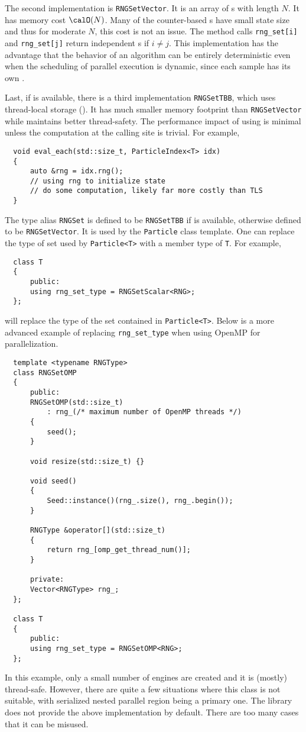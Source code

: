 The second implementation is \verb|RNGSetVector|. It is an array of \rng{}s
with length $N$. It has memory cost $\calO(N)$. Many of the counter-based
\rng{}s have small state size and thus for moderate $N$, this cost is not an
issue. The method calls \verb|rng_set[i]| and \verb|rng_set[j]| return
independent \rng{}s if $i \ne j$. This implementation has the advantage that
the behavior of an algorithm can be entirely deterministic even when the
scheduling of parallel execution is dynamic, since each sample has its own
\rng.

Last, if \tbb is available, there is a third implementation \verb|RNGSetTBB|,
which uses thread-local storage (\tls). It has much smaller memory footprint
than \verb|RNGSetVector| while maintains better thread-safety. The performance
impact of using \tls is minimal unless the computation at the calling site is
trivial. For example,
\begin{Verbatim}
  void eval_each(std::size_t, ParticleIndex<T> idx)
  {
      auto &rng = idx.rng();
      // using rng to initialize state
      // do some computation, likely far more costly than TLS
  }
\end{Verbatim}
The type alias \verb|RNGSet| is defined to be \verb|RNGSetTBB| if \tbb is
available, otherwise defined to be \verb|RNGSetVector|. It is used by the
\verb|Particle| class template. One can replace the type of \rng set used by
\verb|Particle<T>| with a member type of \verb|T|. For example,
\begin{Verbatim}
  class T
  {
      public:
      using rng_set_type = RNGSetScalar<RNG>;
  };
\end{Verbatim}
will replace the type of the \rng set contained in \verb|Particle<T>|. Below is
a more advanced example of replacing \verb|rng_set_type| when using OpenMP for
parallelization.
\begin{Verbatim}
  template <typename RNGType>
  class RNGSetOMP
  {
      public:
      RNGSetOMP(std::size_t)
          : rng_(/* maximum number of OpenMP threads */)
      {
          seed();
      }

      void resize(std::size_t) {}

      void seed()
      {
          Seed::instance()(rng_.size(), rng_.begin());
      }

      RNGType &operator[](std::size_t)
      {
          return rng_[omp_get_thread_num()];
      }

      private:
      Vector<RNGType> rng_;
  };

  class T
  {
      public:
      using rng_set_type = RNGSetOMP<RNG>;
  };
\end{Verbatim}
In this example, only a small number of \rng{} engines are created and it is
(mostly) thread-safe. However, there are quite a few situations where this
class is not suitable, with serialized nested parallel region being a primary
one. The library does not provide the above implementation by default. There
are too many cases that it can be misused.

